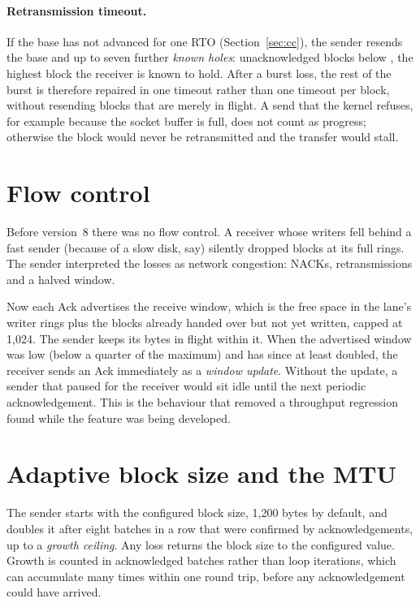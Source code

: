\paragraph{Retransmission timeout\vviii.} If the base has not advanced for one RTO (Section~\ref{sec:cc}), the
sender resends the base and up to seven further \emph{known holes}: unacknowledged blocks below
, the highest block the receiver is known to hold. After a burst loss, the rest of the burst
is therefore repaired in one timeout rather than one timeout per block, without resending blocks that are merely
in flight. A send that the kernel refuses, for example because the socket buffer is full, does not count as
progress; otherwise the block would never be retransmitted and the transfer would stall.

\section{Flow control}\label{sec:flow}

Before version~8 there was no flow control. A receiver whose writers fell behind a fast sender (because of a
slow disk, say) silently dropped blocks at its full rings. The sender interpreted the losses as network
congestion: NACKs, retransmissions and a halved window.

Now each Ack advertises the receive window, which is the free space in the lane's writer rings plus the blocks
already handed over but not yet written, capped at 1,024. The sender keeps its bytes in flight within it. When
the advertised window was low (below a quarter of the maximum) and has since at least doubled, the receiver
sends an Ack immediately as a \emph{window update}. Without the update, a sender that paused for the receiver
would sit idle until the next periodic acknowledgement. This is the behaviour that removed a throughput
regression found while the feature was being developed.

\section{Adaptive block size and the MTU}\label{sec:blocksize}

The sender starts with the configured block size, 1,200 bytes by default, and doubles it after eight batches
in a row that were confirmed by acknowledgements, up to a \emph{growth ceiling}\vviii. Any loss returns the
block size to the configured value. Growth is counted in acknowledged batches rather than loop iterations, which
can accumulate many times within one round trip, before any acknowledgement could have arrived.

